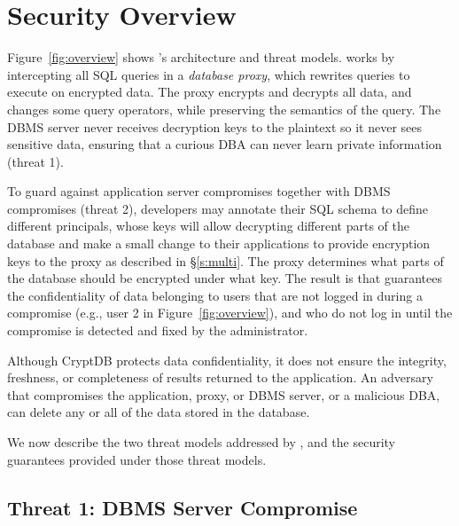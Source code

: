 
\section{Security Overview}
\label{s:model}

Figure~\ref{fig:overview} shows \name's architecture and threat
models.  \name{} works by intercepting all SQL queries in a {\em
  database proxy}, which rewrites queries to execute on encrypted
data.  The proxy encrypts and decrypts all data, and changes some
query operators, while preserving the semantics of the query.
The DBMS server never receives decryption keys to the plaintext so it
never sees sensitive data, ensuring that a curious DBA can never
learn private information (threat 1).


To guard against application server compromises together with DBMS compromises (threat 2), developers
may annotate their SQL schema to define different principals, whose
keys will allow decrypting different parts of the database and make a small change to their applications to provide
encryption keys to the proxy as described in \S\ref{s:multi}.  
The
\name{} proxy determines what parts of the database should be
encrypted under what key.  The result is that \name guarantees the
confidentiality of data belonging to users that are not logged in
during a compromise (e.g., user 2 in Figure~\ref{fig:overview}), and
who do not log in until the compromise is detected and fixed by
the administrator.

Although CryptDB protects data confidentiality, it does not ensure
the integrity, freshness, or completeness of results returned to the
application.  An adversary that compromises the application, proxy,
or DBMS server, or a malicious DBA, can delete any or all of the data
stored in the database.

We now describe the two threat models addressed by \name{}, and the
security guarantees provided under those threat models.


\subsection{Threat 1: DBMS Server Compromise}
\label{ss:dbthreat}

